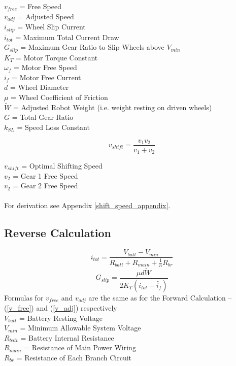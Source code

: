 \documentclass[11pt,a4paper,titlepage]{article}
\begin{document}
	
	$v_{free}$ = Free Speed \\
	$v_{adj}$ = Adjusted Speed \\
	$i_{slip}$ = Wheel Slip Current \\
	$i_{tot}$ = Maximum Total Current Draw \\
	$G_{slip}$ = Maximum Gear Ratio to Slip Wheels above $V_{min}$ \\
	$K_T$ = Motor Torque Constant \\
	$\omega_f$ = Motor Free Speed \\
	$i_f$ = Motor Free Current \\
	$d$ = Wheel Diameter \\
	$\mu$ = Wheel Coefficient of Friction \\
	$\tilde{W}$ = Adjusted Robot Weight (i.e. weight resting on driven wheels) \\
	$G$ = Total Gear Ratio \\
	$k_{SL}$ = Speed Loss Constant
	
	\begin{equation} \label{v_shift}
		v_{shift} = \frac{v_1 v_2}{v_1 + v_2}
	\end{equation}
	
	$v_{shift}$ = Optimal Shifting Speed \\
	$v_2$ = Gear 1 Free Speed \\
	$v_2$ = Gear 2 Free Speed \\ \\
	For derivation see Appendix \ref{shift_speed_appendix}.
	
	\subsection{Reverse Calculation}
	\begin{equation}
		i_{tot} = \frac{V_{batt} - V_{min}}{R_{batt} + R_{main} + \frac{1}{n}R_{br}}
	\end{equation}
	\begin{equation}
		G_{slip} = \frac{\mu d \tilde{W}}{2 K_T \left( i_{tot} - \tilde{i_f} \right)}
	\end{equation}
	Formulas for $v_{free}$ and $v_{adj}$ are the same as for the Forward Calculation -- (\ref{v_free}) and (\ref{v_adj}) respectively\\
	
	$V_{batt}$ = Battery Resting Voltage \\
	$V_{min}$ = Minimum Allowable System Voltage \\
	$R_{batt}$ = Battery Internal Resistance \\
	$R_{main}$ = Resistance of Main Power Wiring \\
	$R_{br}$ = Resistance of Each Branch Circuit
	
\end{document}
